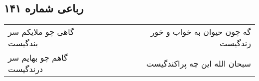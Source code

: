 \begin{center}
\section*{رباعی شماره ۱۴۱}
\label{sec:sh141}
\begin{longtable}{l p{0.5cm} r}
گاهی چو ملایکم سر بندگیست
&&
گه چون حیوان به خواب و خور زندگیست
\\
گاهم چو بهایم سر درندگیست
&&
سبحان الله این چه پراکندگیست
\\
\end{longtable}
\end{center}
